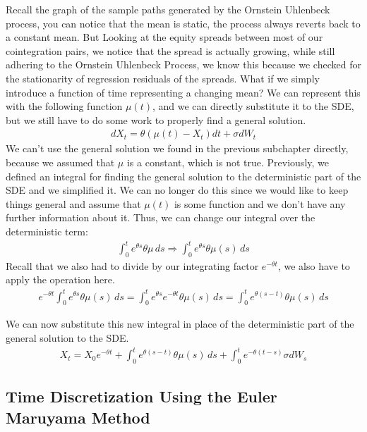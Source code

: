 \documentclass{article}
\begin{document}
\begin{spacing}{2.0}
Recall the graph of the sample paths generated by the Ornstein Uhlenbeck process, you can notice that the mean is static, the process always reverts back to a constant mean. But Looking
at the equity spreads between most of our cointegration pairs, we notice that the spread is actually growing, while still adhering to the Ornstein Uhlenbeck Process, we know this because
we checked for the stationarity of regression residuals of the spreads. What if we simply introduce a function of time representing a changing mean? We can represent this with the following
function $\mu(t)$, and we can directly substitute it to the SDE, but we still have to do some work to properly find a general solution.
\begin{gather*}
    dX_{t} = \theta \left ( \mu(t) - X_{t} \right )dt + \sigma dW_{t}
\end{gather*}
We can't use the general solution we found in the previous subchapter directly, because we assumed that $\mu$ is a constant, which is not true. Previously, we defined an integral for
finding the general solution to the deterministic part of the SDE and we simplified it. We can no longer do this since we would like to keep things general and assume that $\mu(t)$ is
some function and we don't have any further information about it. Thus, we can change our integral over the deterministic term:
\begin{gather*}
    \int_{0}^{t} e^{\theta s} \theta \mu \, ds \Longrightarrow \int_{0}^{t} e^{\theta s} \theta \mu(s) \, ds
\end{gather*}
Recall that we also had to divide by our integrating factor $e^{-\theta t}$, we also have to apply the operation here.
\begin{gather*}
    e^{-\theta t} \int_{0}^{t} e^{\theta s} \theta \mu(s) \, ds = \int_{0}^{t} e^{\theta s} e^{-\theta t} \theta \mu(s) \, ds
    = \int_{0}^{t} e^{\theta (s - t)} \theta \mu(s) \, ds
\end{gather*}

We can now substitute this new integral in place of the deterministic part of the general solution to the SDE.
\begin{gather*}
    X_{t} = X_{0}e^{-\theta t} + \int_{0}^{t} e^{\theta (s - t)} \theta \mu(s) \, ds + \int_{0}^{t} e^{-\theta (t - s)} \sigma dW_{s}
\end{gather*}

\subsection{Time Discretization Using the Euler Maruyama Method}


\end{spacing}
\end{document}
